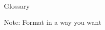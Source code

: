 \clearpage
{}  %
\begin{centering}
Glossary\\
\end{centering}

\noindent  Note: Format in a way you want \\

\lipsum[1]